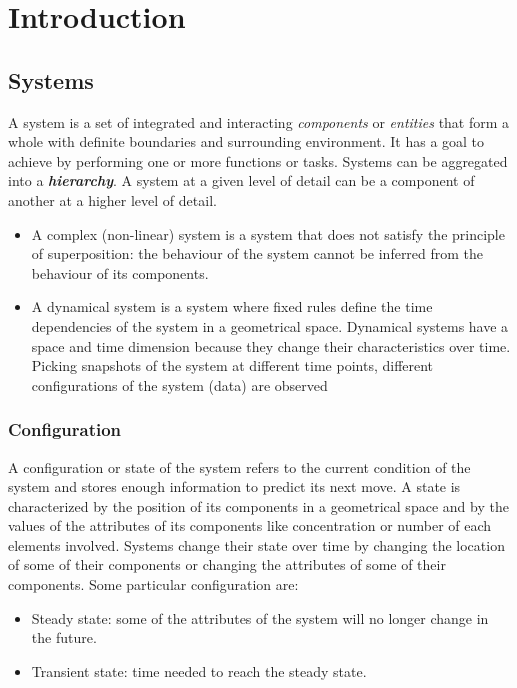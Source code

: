 \graphicspath{{chapters/07/images/}}
\chapter{Introduction}

\section{Systems}
A system is a set of integrated and interacting \emph{components} or \emph{entities} that form a whole with definite boundaries and surrounding environment.
It has a goal to achieve by performing one or more functions or tasks.
Systems can be aggregated into a \textbf{\emph{hierarchy}}.
A system at a given level of detail can be a component of another at a higher level of detail.

\begin{multicols}{2}
  \begin{itemize}
    \item A complex (non-linear) system is a system that does not satisfy the principle of superposition: the behaviour of the system cannot be inferred from the behaviour of its components.
    \item A dynamical system is a system where fixed rules define the time dependencies of the system in a geometrical space.
      Dynamical systems have a space and time dimension because they change their characteristics over time.
      Picking snapshots of the system at different time points, different configurations of the system (data) are observed
  \end{itemize}
\end{multicols}

  \subsection{Configuration}
  A configuration or state of the system refers to the current condition of the system and stores enough information to predict its next move.
  A state is characterized by the position of its components in a geometrical space and by the values of the attributes of its components like concentration or number of each elements involved.
  Systems change their state over time by changing the location of some of their components or changing the attributes of some of their components.
  Some particular configuration are:

  \begin{multicols}{2}
    \begin{itemize}
      \item Steady state: some of the attributes of the system will no longer change in the future.
      \item Transient state: time needed to reach the steady state.
    \end{itemize}
  \end{multicols}


